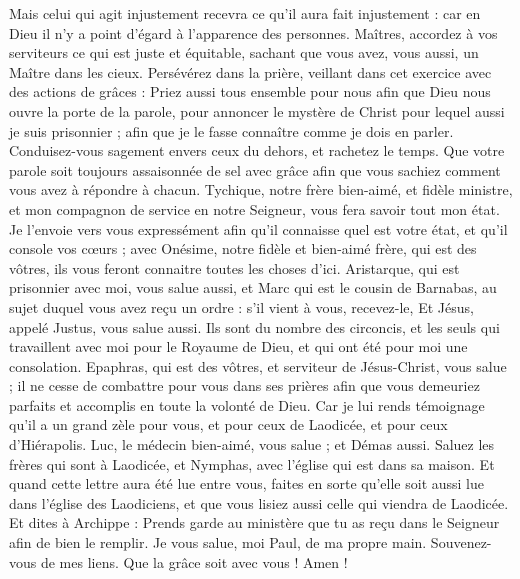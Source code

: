 \begin{multicols}{2}
Mais celui qui agit injustement recevra ce qu'il aura fait injustement : car en Dieu il n'y a point d'égard à l'apparence des personnes.
\VerseOne{}Maîtres, accordez à vos serviteurs ce qui est juste et équitable, sachant que vous avez, vous aussi, un Maître dans les cieux.
Persévérez dans la prière, veillant dans cet exercice avec des actions de grâces :
Priez aussi tous ensemble pour nous afin que Dieu nous ouvre la porte de la parole, pour annoncer le mystère de Christ pour lequel aussi je suis prisonnier ; 
afin que je le fasse connaître comme je dois en parler.
Conduisez-vous sagement envers ceux du dehors, et rachetez le temps.
Que votre parole soit toujours assaisonnée de sel avec grâce afin que vous sachiez comment vous avez à répondre à chacun.
Tychique, notre frère bien-aimé, et fidèle ministre, et mon compagnon de service en notre Seigneur, vous fera savoir tout mon état.
Je l'envoie vers vous expressément afin qu'il connaisse quel est votre état, et qu'il console vos cœurs ;
avec Onésime, notre fidèle et bien-aimé frère, qui est des vôtres, ils vous feront connaitre toutes les choses d'ici.
Aristarque, qui est prisonnier avec moi, vous salue aussi, et Marc qui est le cousin de Barnabas, au sujet duquel vous avez reçu un ordre : s'il vient à vous, recevez-le,
Et Jésus, appelé Justus, vous salue aussi. Ils sont du nombre des circoncis, et les seuls qui travaillent avec moi pour le Royaume de Dieu, et qui ont été pour moi une consolation.
Epaphras, qui est des vôtres, et serviteur de Jésus-Christ, vous salue ; il ne cesse de combattre pour vous dans ses prières afin que vous demeuriez parfaits et accomplis en toute la volonté de Dieu.
Car je lui rends témoignage qu'il a un grand zèle pour vous, et pour ceux de Laodicée, et pour ceux d'Hiérapolis.
Luc, le médecin bien-aimé, vous salue ; et Démas aussi.
Saluez les frères qui sont à Laodicée, et Nymphas, avec l'église qui est dans sa maison.
Et quand cette lettre aura été lue entre vous, faites en sorte qu'elle soit aussi lue dans l'église des Laodiciens, et que vous lisiez aussi celle qui viendra de Laodicée.
Et dites à Archippe : Prends garde au ministère que tu as reçu dans le Seigneur afin de bien le remplir.
Je vous salue, moi Paul, de ma propre main. Souvenez-vous de mes liens. Que la grâce soit avec vous ! Amen !
\PPE{}
\end{multicols}

